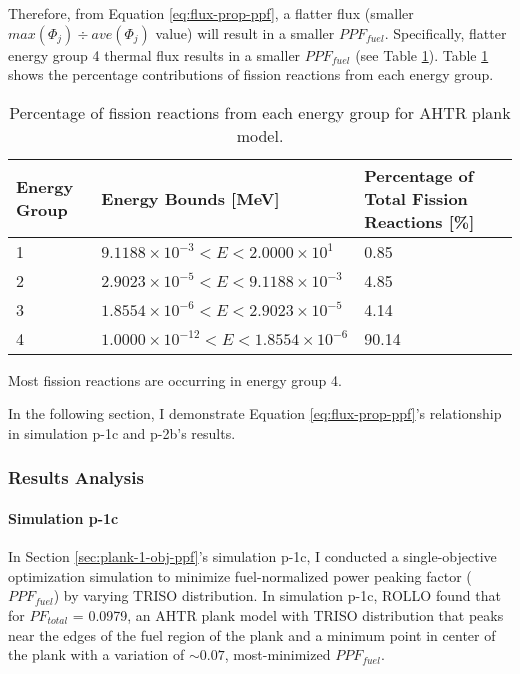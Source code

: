 Therefore, from Equation \ref{eq:flux-prop-ppf}, a flatter flux (smaller 
$max(\Phi_j) \div ave(\Phi_j)$ value) will result in a smaller $PPF_{fuel}$. 
Specifically, flatter energy group 4 thermal flux results in a smaller $PPF_{fuel}$
(see Table \ref{tab:fission-flux}). 
Table \ref{tab:fission-flux} shows the percentage contributions of fission reactions from 
each energy group. 
\begin{table}[htbp!]
    \centering
    \onehalfspacing
    \caption{Percentage of fission reactions from each energy group for \gls{AHTR} plank model.}
	\label{tab:fission-flux}
    \footnotesize
    \begin{tabular}{llp{4cm}}
    \hline 
    \textbf{Energy Group} & \textbf{Energy Bounds [MeV]} & \textbf{Percentage of Total Fission Reactions [\%]} \\
    \hline
    1 & $9.1188\times 10^{-3} < E < 2.0000\times 10^1$ & 0.85 \\ 
    2 & $2.9023\times 10^{-5} < E < 9.1188\times 10^{-3}$ & 4.85 \\
    3 & $1.8554\times 10^{-6} < E < 2.9023\times 10^{-5}$ & 4.14 \\
    4 & $1.0000\times 10^{-12} < E < 1.8554\times 10^{-6}$ & 90.14 \\
    \hline
    \end{tabular}
\end{table}
Most fission reactions are occurring in energy group 4. 

In the following section, I demonstrate Equation \ref{eq:flux-prop-ppf}'s relationship 
in simulation p-1c and p-2b's results. 

\subsubsection{Results Analysis}
\label{sec:plank-discussion-ppf-results}

\paragraph{Simulation p-1c}
In Section \ref{sec:plank-1-obj-ppf}'s simulation p-1c, I conducted a single-objective 
optimization simulation to minimize fuel-normalized power peaking factor ($PPF_{fuel}$) 
by varying TRISO distribution. 
In simulation p-1c, \gls{ROLLO} found that for $PF_{total}$ = 0.0979, an \gls{AHTR} 
plank model with TRISO distribution that peaks near the edges of the fuel region of 
the plank and a minimum point in center of the plank with a variation of $\sim0.07$, 
most-minimized $PPF_{fuel}$. 


